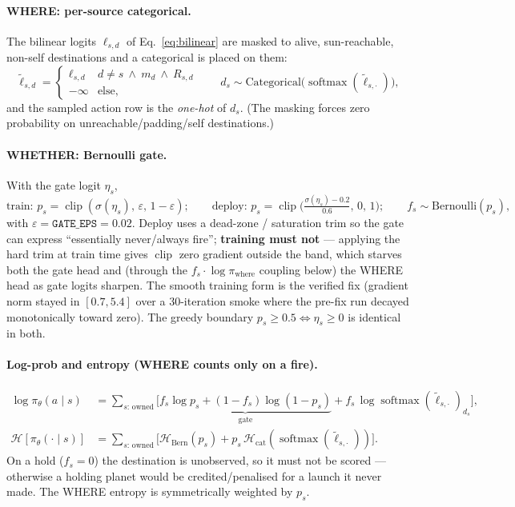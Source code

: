 \documentclass[11pt]{article}
\newcommand{\pol}{\pi_\theta}
\newcommand{\softmax}{\operatorname{softmax}}
\newcommand{\clip}{\operatorname{clip}}
\newcommand{\cd}[1]{\texttt{#1}}
\begin{document}
\paragraph{WHERE: per-source categorical.} The bilinear logits $\ell_{s,d}$ of
Eq.~\eqref{eq:bilinear} are masked to alive, sun-reachable, non-self destinations and a categorical is
placed on them:
\begin{equation}
\tilde\ell_{s,d}=\begin{cases}\ell_{s,d} & d\neq s\ \wedge\ m_d\ \wedge\ R_{s,d}\\ -\infty & \text{else,}\end{cases}
\qquad d_s\sim\mathrm{Categorical}\big(\softmax(\tilde\ell_{s,\cdot})\big),
\label{eq:where}
\end{equation}
and the sampled action row is the \emph{one-hot} of $d_s$. (The masking forces zero probability on
unreachable/padding/self destinations.)

\paragraph{WHETHER: Bernoulli gate.} With the gate logit $\eta_s$,
\begin{equation}
\text{train: } p_s=\clip(\sigma(\eta_s),\,\varepsilon,\,1{-}\varepsilon);\qquad
\text{deploy: } p_s=\clip\!\Big(\tfrac{\sigma(\eta_s)-0.2}{0.6},\,0,\,1\Big);\qquad
f_s\sim\mathrm{Bernoulli}(p_s),
\end{equation}
with $\varepsilon=\cd{GATE\_EPS}=0.02$. Deploy uses a dead-zone / saturation trim so the gate can express
``essentially never/always fire''; \textbf{training must not} --- applying the hard trim at train time
gives $\clip$ zero gradient outside the band, which starves both the gate head and (through the
$f_s\cdot\log\pi_{\text{where}}$ coupling below) the WHERE head as gate logits sharpen. The smooth
training form is the verified fix (gradient norm stayed in $[0.7,5.4]$ over a 30-iteration smoke where the
pre-fix run decayed monotonically toward zero). The greedy boundary $p_s\ge0.5\Leftrightarrow\eta_s\ge0$
is identical in both.

\paragraph{Log-prob and entropy (WHERE counts only on a fire).}
\begin{align}
\log\pol(a\mid s) &=\!\!\sum_{s:\,\text{owned}}\!\!\Big[\underbrace{f_s\log p_s+(1{-}f_s)\log(1{-}p_s)}_{\text{gate}}
   +f_s\,\log\softmax(\tilde\ell_{s,\cdot})_{d_s}\Big],\label{eq:logp}\\
\mathcal H[\pol(\cdot\mid s)] &=\!\!\sum_{s:\,\text{owned}}\!\!\Big[\mathcal H_{\mathrm{Bern}}(p_s)
   +p_s\,\mathcal H_{\mathrm{cat}}(\softmax(\tilde\ell_{s,\cdot}))\Big].
\end{align}
On a hold ($f_s{=}0$) the destination is unobserved, so it must not be scored --- otherwise a holding
planet would be credited/penalised for a launch it never made. The WHERE entropy is symmetrically
weighted by $p_s$.
\end{document}
